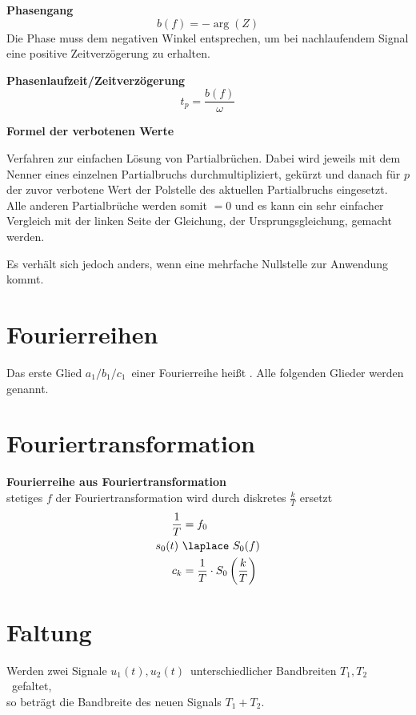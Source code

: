 \documentclass[12pt, a4paper]{scrartcl}
\begin{document}
\textbf{Phasengang}
\[b(f) = -\arg(Z)\]
Die Phase muss dem negativen Winkel entsprechen, um bei nachlaufendem Signal eine positive Zeitverzögerung zu erhalten.

\textbf{Phasenlaufzeit/Zeitverzögerung}
\[t_p = \frac{b(f)}{\omega}\]

\textbf{Formel der verbotenen Werte}

Verfahren zur einfachen Lösung von Partialbrüchen. Dabei wird jeweils mit dem Nenner eines einzelnen Partialbruchs durchmultipliziert, gekürzt und danach für \(p\) der zuvor verbotene Wert der Polstelle des aktuellen Partialbruchs eingesetzt. Alle anderen Partialbrüche werden somit \(=0\) und es kann ein sehr einfacher Vergleich mit der linken Seite der Gleichung, der Ursprungsgleichung, gemacht werden.

Es verhält sich jedoch anders, wenn eine mehrfache Nullstelle zur Anwendung kommt.

\section{Fourierreihen}

\begin{tcolorbox}
  Das erste Glied \(a_1 / b_1 / c_1\)~einer Fourierreihe heißt . Alle folgenden Glieder werden  genannt.
\end{tcolorbox}


\section{Fouriertransformation}

\textbf{Fourierreihe aus Fouriertransformation}\\
 stetiges \(f\) der Fouriertransformation wird durch diskretes \(\frac{k}{T}\) ersetzt
\begin{align*}
  \frac{1}{T} &= f_0\\
  s_0(t)\ &\laplace\ S_0(f)\\
  c_k &= \frac{1}{T} \cdot S_0\left(\frac{k}{T}\right)
\end{align*}

\section{Faltung}

\begin{tcolorbox}
  Werden zwei Signale \(u_1(t), u_2(t)\)~unterschiedlicher Bandbreiten \(T_1, T_2\)~gefaltet,\\
  so beträgt die Bandbreite des neuen Signals \(T_1 + T_2\).
\end{tcolorbox}
\end{document}

